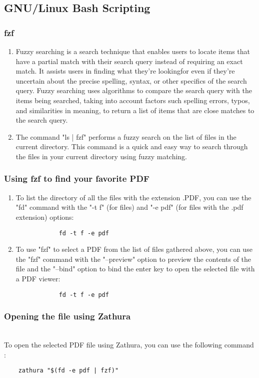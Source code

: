 \documentclass[titlepage]{article}
\begin{document}
	\subsection{GNU/Linux Bash Scripting}
	\subsubsection{fzf}
	\begin{enumerate}
		\item Fuzzy searching is a search technique that enables users to locate items that have a partial match with their search query instead of requiring an exact match. It assists users in finding what they're lookingfor even if they're uncertain about the precise spelling, syntax, or other specifics of the search query. Fuzzy searching uses algorithms to compare the search query with the items being searched, taking into account factors such spelling errors, typos, and similarities in meaning, to return a list of items that are close matches to the search query. \\
		\item The command "ls | fzf" performs a fuzzy search on the list of files in the current directory. This command is a quick and easy way to search through the files in your current directory using fuzzy matching.
	\end{enumerate}
	\subsubsection{Using fzf to find your favorite PDF}
	\begin{enumerate}
		\item To list the directory of all the files with the extension .PDF, you can use the "fd" command with the "-t f" (for files) and "-e pdf" (for files with the .pdf extension) options:
			\begin{verbatim}
			fd -t f -e pdf
			\end{verbatim}
		\item To use "fzf" to select a PDF from the list of files gathered above, you can use the "fzf" command with the "--preview" option to preview the contents of the file and the "--bind" option to bind the enter key to open the selected file with a PDF viewer:
			\begin{verbatim}
			fd -t f -e pdf
			\end{verbatim}
	\end{enumerate}

	\subsubsection{Opening the file using Zathura}\\
	To open the selected PDF file using Zathura, you can use the following command :
	\begin{verbatim}
	zathura "$(fd -e pdf | fzf)"
	\end{verbatim}
\end{document}

